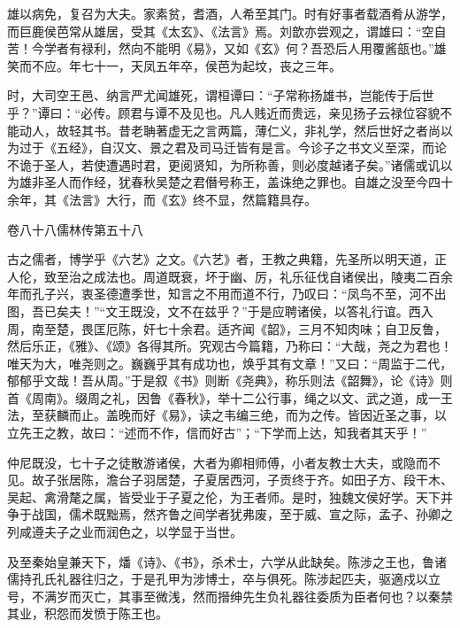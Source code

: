 \documentclass[12pt,UTF8]{ctexbook}
\begin{document}
雄以病免，复召为大夫。家素贫，耆酒，人希至其门。时有好事者载酒肴从游学，而巨鹿侯芭常从雄居，受其《太玄》、《法言》焉。刘歆亦尝观之，谓雄曰：“空自苦！今学者有禄利，然向不能明《易》，又如《玄》何？吾恐后人用覆酱瓿也。”雄笑而不应。年七十一，天凤五年卒，侯芭为起坟，丧之三年。



时，大司空王邑、纳言严尤闻雄死，谓桓谭曰：“子常称扬雄书，岂能传于后世乎？”谭曰：“必传。顾君与谭不及见也。凡人贱近而贵远，亲见扬子云禄位容貌不能动人，故轻其书。昔老聃著虚无之言两篇，薄仁义，非礼学，然后世好之者尚以为过于《五经》，自汉文、景之君及司马迁皆有是言。今诊子之书文义至深，而论不诡于圣人，若使遭遇时君，更阅贤知，为所称善，则必度越诸子矣。”诸儒或讥以为雄非圣人而作经，犹春秋吴楚之君僭号称王，盖诛绝之罪也。自雄之没至今四十余年，其《法言》大行，而《玄》终不显，然篇籍具存。





卷八十八儒林传第五十八



古之儒者，博学乎《六艺》之文。《六艺》者，王教之典籍，先圣所以明天道，正人伦，致至治之成法也。周道既衰，坏于幽、厉，礼乐征伐自诸侯出，陵夷二百余年而孔子兴，衷圣德遭季世，知言之不用而道不行，乃叹曰：“凤鸟不至，河不出图，吾已矣夫！”“文王既没，文不在兹乎？”于是应聘诸侯，以答礼行谊。西入周，南至楚，畏匡厄陈，奸七十余君。适齐闻《韶》，三月不知肉味；自卫反鲁，然后乐正，《雅》、《颂》各得其所。究观古今篇籍，乃称曰：“大哉，尧之为君也！唯天为大，唯尧则之。巍巍乎其有成功也，焕乎其有文章！”又曰：“周监于二代，郁郁乎文哉！吾从周。”于是叙《书》则断《尧典》，称乐则法《韶舞》，论《诗》则首《周南》。缀周之礼，因鲁《春秋》，举十二公行事，绳之以文、武之道，成一王法，至获麟而止。盖晚而好《易》，读之韦编三绝，而为之传。皆因近圣之事，以立先王之教，故曰：“述而不作，信而好古”；“下学而上达，知我者其天乎！”



仲尼既没，七十子之徒散游诸侯，大者为卿相师傅，小者友教士大夫，或隐而不见。故子张居陈，澹台子羽居楚，子夏居西河，子贡终于齐。如田子方、段干木、吴起、禽滑氂之属，皆受业于子夏之伦，为王者师。是时，独魏文侯好学。天下并争于战国，儒术既黜焉，然齐鲁之间学者犹弗废，至于威、宣之际，孟子、孙卿之列咸遵夫子之业而润色之，以学显于当世。



及至秦始皇兼天下，燔《诗》、《书》，杀术士，六学从此缺矣。陈涉之王也，鲁诸儒持孔氏礼器往归之，于是孔甲为涉博士，卒与俱死。陈涉起匹夫，驱適戍以立号，不满岁而灭亡，其事至微浅，然而搢绅先生负礼器往委质为臣者何也？以秦禁其业，积怨而发愤于陈王也。
\end{document}
